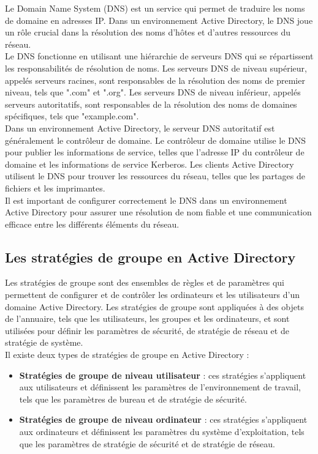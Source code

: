 \documentclass[12pt, a4paper]{article}
\begin{document}
Le Domain Name System (DNS) est un service qui permet de traduire les noms de 
domaine en adresses IP. Dans un environnement Active Directory, le DNS joue un 
rôle crucial dans la résolution des noms d'hôtes et d'autres ressources du 
réseau.\\

Le DNS fonctionne en utilisant une hiérarchie de serveurs DNS qui se 
répartissent les responsabilités de résolution de noms. Les serveurs DNS 
de niveau supérieur, appelés serveurs racines, sont responsables de la résolution 
des noms de premier niveau, tels que ".com" et ".org". Les serveurs DNS de niveau 
inférieur, appelés serveurs autoritatifs, sont responsables de la résolution des 
noms de domaines spécifiques, tels que "example.com".\\

Dans un environnement Active Directory, le serveur DNS autoritatif est 
généralement le contrôleur de domaine. Le contrôleur de domaine utilise le 
DNS pour publier les informations de service, telles que l'adresse IP du 
contrôleur de domaine et les informations de service Kerberos. Les clients 
Active Directory utilisent le DNS pour trouver les ressources du réseau, 
telles que les partages de fichiers et les imprimantes.\\

Il est important de configurer correctement le DNS dans un environnement 
Active Directory pour assurer une résolution de nom fiable et une communication 
efficace entre les différents éléments du réseau.

\newpage
\subsection{Les stratégies de groupe en Active Directory}

Les stratégies de groupe sont des ensembles de règles et de paramètres qui 
permettent de configurer et de contrôler les ordinateurs et les utilisateurs 
d'un domaine Active Directory. Les stratégies de groupe sont appliquées à des 
objets de l'annuaire, tels que les utilisateurs, les groupes et les ordinateurs, 
et sont utilisées pour définir les paramètres de sécurité, de stratégie de réseau 
et de stratégie de système.\\

Il existe deux types de stratégies de groupe en Active Directory :\\

\begin{itemize}
    \item \textbf{Stratégies de groupe de niveau utilisateur} : ces stratégies s'appliquent aux utilisateurs et définissent les paramètres de l'environnement de travail, tels que les paramètres de bureau et de stratégie de sécurité.
    \item \textbf{Stratégies de groupe de niveau ordinateur} : ces stratégies s'appliquent aux ordinateurs et définissent les paramètres du système d'exploitation, tels que les paramètres de stratégie de sécurité et de stratégie de réseau.\\
\end{itemize}
\end{document}

